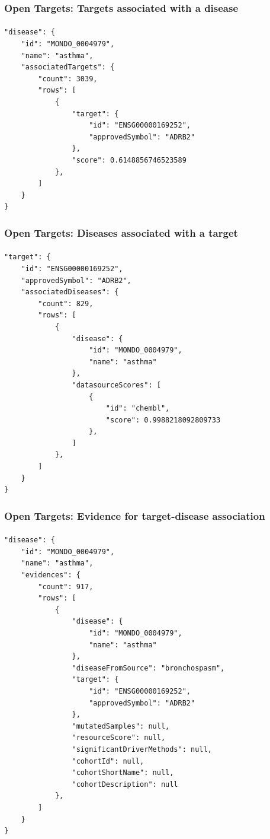 \documentclass[aspectratio=169,xcolor=dvipsnames]{beamer}
\begin{document}
\begin{frame}[fragile,t]
  \frametitle{Open Targets: Targets associated with a disease}
  \framesubtitle{}
  \tiny
\begin{verbatim}
"disease": {
    "id": "MONDO_0004979",
    "name": "asthma",
    "associatedTargets": {
        "count": 3039,
        "rows": [
            {
                "target": {
                    "id": "ENSG00000169252",
                    "approvedSymbol": "ADRB2"
                },
                "score": 0.6148856746523589
            },
        ]
    }
}
\end{verbatim}
\end{frame}

\begin{frame}[fragile,t]
  \frametitle{Open Targets: Diseases associated with a target}
  \framesubtitle{}
  \tiny
\begin{verbatim}
"target": {
    "id": "ENSG00000169252",
    "approvedSymbol": "ADRB2",
    "associatedDiseases": {
        "count": 829,
        "rows": [
            {
                "disease": {
                    "id": "MONDO_0004979",
                    "name": "asthma"
                },
                "datasourceScores": [
                    {
                        "id": "chembl",
                        "score": 0.9988218092809733
                    },
                ]
            },
        ]
    }
}
\end{verbatim}
\end{frame}

\begin{frame}[fragile,t]
  \frametitle{Open Targets: Evidence for target-disease association}
  \framesubtitle{}
  \tiny
\begin{verbatim}
"disease": {
    "id": "MONDO_0004979",
    "name": "asthma",
    "evidences": {
        "count": 917,
        "rows": [
            {
                "disease": {
                    "id": "MONDO_0004979",
                    "name": "asthma"
                },
                "diseaseFromSource": "bronchospasm",
                "target": {
                    "id": "ENSG00000169252",
                    "approvedSymbol": "ADRB2"
                },
                "mutatedSamples": null,
                "resourceScore": null,
                "significantDriverMethods": null,
                "cohortId": null,
                "cohortShortName": null,
                "cohortDescription": null
            },
        ]
    }
}
\end{verbatim}
\end{frame}
\end{document}
